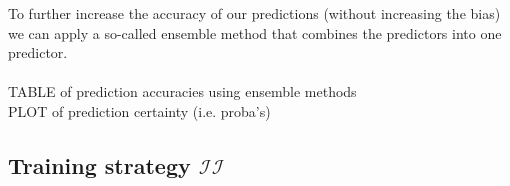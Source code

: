 \documentclass[a4paper,10pt]{article}
\begin{document}
%
To further increase the accuracy of our predictions (without increasing the bias) we can apply a so-called ensemble method that combines the predictors
into one predictor. \\ \\
%
TABLE of prediction accuracies using ensemble methods  \\ %
PLOT of prediction certainty (i.e. proba's)
%
\subsection{Training strategy $\mathcal{II}$}

\end{document}
